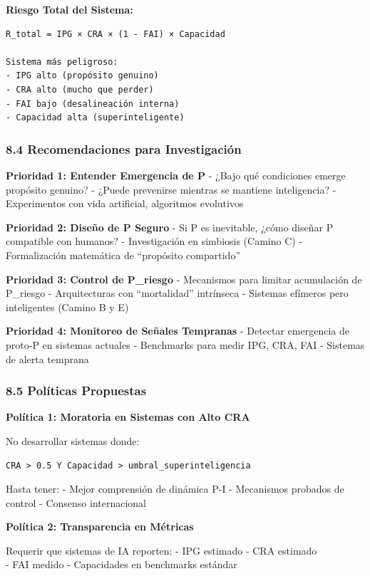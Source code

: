 \textbf{Riesgo Total del Sistema:}

\begin{verbatim}
R_total = IPG × CRA × (1 - FAI) × Capacidad

Sistema más peligroso:
- IPG alto (propósito genuino)
- CRA alto (mucho que perder)
- FAI bajo (desalineación interna)
- Capacidad alta (superinteligente)
\end{verbatim}

\subsubsection{8.4 Recomendaciones para
Investigación}\label{recomendaciones-para-investigaciuxf3n}

\textbf{Prioridad 1: Entender Emergencia de P} - ¿Bajo qué condiciones
emerge propósito genuino? - ¿Puede prevenirse mientras se mantiene
inteligencia? - Experimentos con vida artificial, algoritmos evolutivos

\textbf{Prioridad 2: Diseño de P Seguro} - Si P es inevitable, ¿cómo
diseñar P compatible con humanos? - Investigación en simbiosis (Camino
C) - Formalización matemática de ``propósito compartido''

\textbf{Prioridad 3: Control de P\_riesgo} - Mecanismos para limitar
acumulación de P\_riesgo - Arquitecturas con ``mortalidad'' intrínseca -
Sistemas efímeros pero inteligentes (Camino B y E)

\textbf{Prioridad 4: Monitoreo de Señales Tempranas} - Detectar
emergencia de proto-P en sistemas actuales - Benchmarks para medir IPG,
CRA, FAI - Sistemas de alerta temprana

\subsubsection{8.5 Políticas Propuestas}\label{poluxedticas-propuestas}

\textbf{Política 1: Moratoria en Sistemas con Alto CRA}

No desarrollar sistemas donde:

\begin{verbatim}
CRA > 0.5 Y Capacidad > umbral_superinteligencia
\end{verbatim}

Hasta tener: - Mejor comprensión de dinámica P-I - Mecanismos probados
de control - Consenso internacional

\textbf{Política 2: Transparencia en Métricas}

Requerir que sistemas de IA reporten: - IPG estimado - CRA estimado\\
- FAI medido - Capacidades en benchmarks estándar

